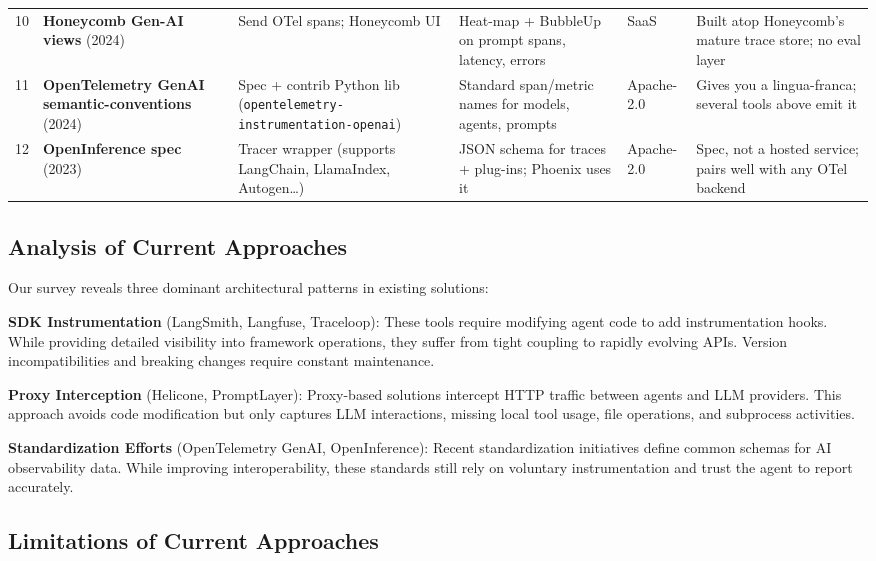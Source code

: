 \documentclass[sigplan,screen，review,9pt]{acmart}
\begin{document}
\begin{table*}[t]
\begin{tabular}{p{0.3cm} p{2.2cm} p{2.5cm} p{2.8cm} p{1.5cm} p{2.2cm}}
10 & \textbf{Honeycomb Gen-AI views} (2024) & Send OTel spans; Honeycomb UI & Heat-map + BubbleUp on prompt spans, latency, errors & SaaS & Built atop Honeycomb's mature trace store; no eval layer \\
11 & \textbf{OpenTelemetry GenAI semantic-conventions} (2024) & Spec + contrib Python lib (\texttt{opentelemetry-instrumentation-openai}) & Standard span/metric names for models, agents, prompts & Apache-2.0 & Gives you a lingua-franca; several tools above emit it \\
12 & \textbf{OpenInference spec} (2023) & Tracer wrapper (supports LangChain, LlamaIndex, Autogen…) & JSON schema for traces + plug-ins; Phoenix uses it & Apache-2.0 & Spec, not a hosted service; pairs well with any OTel backend \\
\bottomrule
\end{tabular}
\end{table*}

\subsection{Analysis of Current Approaches}

Our survey reveals three dominant architectural patterns in existing solutions:

\textbf{SDK Instrumentation} (LangSmith, Langfuse, Traceloop): These tools require modifying agent code to add instrumentation hooks. While providing detailed visibility into framework operations, they suffer from tight coupling to rapidly evolving APIs. Version incompatibilities and breaking changes require constant maintenance.

\textbf{Proxy Interception} (Helicone, PromptLayer): Proxy-based solutions intercept HTTP traffic between agents and LLM providers. This approach avoids code modification but only captures LLM interactions, missing local tool usage, file operations, and subprocess activities.

\textbf{Standardization Efforts} (OpenTelemetry GenAI, OpenInference): Recent standardization initiatives define common schemas for AI observability data. While improving interoperability, these standards still rely on voluntary instrumentation and trust the agent to report accurately.

\subsection{Limitations of Current Approaches}
\end{document}
